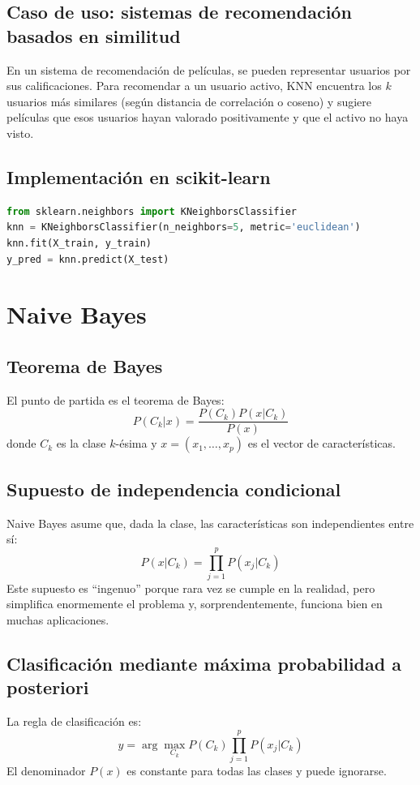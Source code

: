 \documentclass[12pt,a4paper,openany,oneside]{book}
\begin{document}
\subsection{Caso de uso: sistemas de recomendación basados en similitud}
En un sistema de recomendación de películas, se pueden representar usuarios por sus calificaciones. Para recomendar a un usuario activo, KNN encuentra los \(k\) usuarios más similares (según distancia de correlación o coseno) y sugiere películas que esos usuarios hayan valorado positivamente y que el activo no haya visto.

\subsection{Implementación en scikit-learn}
\begin{lstlisting}[language=Python]
from sklearn.neighbors import KNeighborsClassifier
knn = KNeighborsClassifier(n_neighbors=5, metric='euclidean')
knn.fit(X_train, y_train)
y_pred = knn.predict(X_test)
\end{lstlisting}

\section{Naive Bayes}

\subsection{Teorema de Bayes}
El punto de partida es el teorema de Bayes:
\[
P(C_k | x) = \frac{P(C_k) P(x | C_k)}{P(x)}
\]
donde \(C_k\) es la clase \(k\)-ésima y \(x = (x_1, \dots, x_p)\) es el vector de características.

\subsection{Supuesto de independencia condicional}
Naive Bayes asume que, dada la clase, las características son independientes entre sí:
\[
P(x | C_k) = \prod_{j=1}^p P(x_j | C_k)
\]
Este supuesto es ``ingenuo'' porque rara vez se cumple en la realidad, pero simplifica enormemente el problema y, sorprendentemente, funciona bien en muchas aplicaciones.

\subsection{Clasificación mediante máxima probabilidad a posteriori}
La regla de clasificación es:
\[
\hat{y} = \arg\max_{C_k} P(C_k) \prod_{j=1}^p P(x_j | C_k)
\]
El denominador \(P(x)\) es constante para todas las clases y puede ignorarse.
\end{document}
